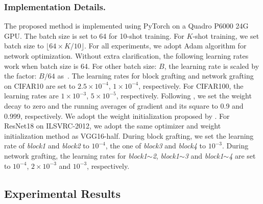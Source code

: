\documentclass[letterpaper]{article} %
\begin{document}
{{        \subsubsection{Implementation Details.}
        {
            The proposed method is implemented using PyTorch on a Quadro P6000 24G GPU.
            The batch size is set to 64 for 10-shot training.
            For $K$-shot training, we set batch size to $\lfloor 64\times K/10 \rfloor$.
            For all experiments, we adopt Adam algorithm for network optimization.
            Without extra clarification, the following learning rates work when batch size is 64.
            For other batch size: $B$, the learning rate is scaled by the factor: $B/64$ as~\cite{he2016deep}.
            The learning rates for block grafting and network grafting on CIFAR10 are set to $2.5 \times 10^{-4}$, $1 \times 10^{-4}$, respectively.
            For CIFAR100, the learning rates are $1 \times 10^{-3}$, $5 \times 10^{-5}$, respectively.
            Following \cite{kingma2014adam}, we set the weight decay to zero and the running averages of gradient and its square to 0.9 and 0.999, respectively.
            We adopt the weight initialization proposed by \cite{he2015delving}.
            For ResNet18 on ILSVRC-2012, we adopt the same optimizer and weight initialization method as VGG16-half.
            During block grafting, we set the learning rate of \emph{block1} and \emph{block2} to $10^{-4}$, the one of \emph{block3} and \emph{block4} to $10^{-3}$.
            During network grafting, the learning rates for \emph{block1$\sim$2}, \emph{block1$\sim$3} and \emph{block1$\sim$4} are set to $10^{-4}$, $2 \times 10^{-3}$ and $10^{-3}$, respectively.
        }


    }

    \subsection{Experimental Results}
    {
        {
}}}
\end{document}
